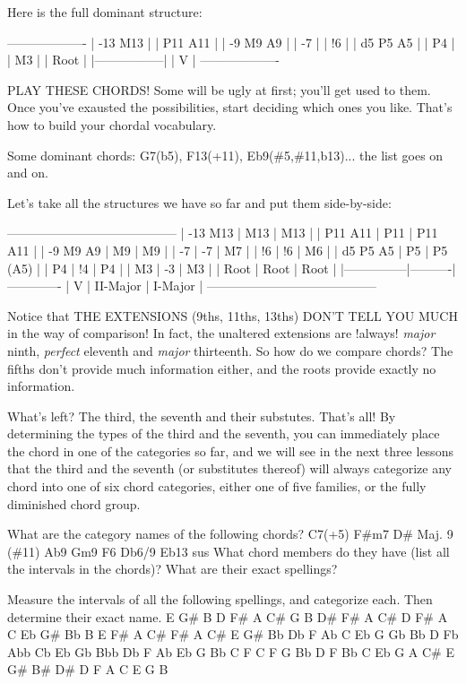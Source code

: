 Here is the full dominant structure:

-------------------
| -13  M13        |
|      P11  A11   |
| -9    M9   A9   |
|       -7        |
|       !6        |
|  d5   P5   A5   |
|       P4        |
|       M3        |
|      Root       |
|-----------------|
|        V        |
-------------------

PLAY THESE CHORDS! Some will be ugly at first; you'll get used to them. Once
you've exausted the possibilities, start deciding which ones you like. That's
how to build your chordal vocabulary.

Some dominant chords: G7(b5), F13(+11), Eb9(\#5,\#11,b13)... the list goes on and
on.

Let's take all the structures we have so far and put them side-by-side:

-----------------------------------------
| -13  M13      |   M13    |  M13       |
|      P11  A11 |   P11    |  P11  A11  |
|  -9   M9   A9 |    M9    |   M9       |
|       -7      |    -7    |   M7       |
|       !6      |    !6    |   M6       |
|  d5   P5   A5 |    P5    |   P5 (A5)  |
|       P4      |    !4    |   P4       |
|       M3      |    -3    |   M3       |
|      Root     |   Root   |  Root      |
|---------------|----------|-------------
|        V      | II-Major | I-Major    |
-----------------------------------------

Notice that THE EXTENSIONS (9ths, 11ths, 13ths) DON'T TELL YOU MUCH in the way
of comparison! In fact, the unaltered extensions are !always! \emph{major} ninth,
\emph{perfect} eleventh and \emph{major} thirteenth. So how do we compare chords? The
fifths don't provide much information either, and the roots provide exactly no
information. 

What's left? The third, the seventh and their substutes. That's all! By
determining the types of the third and the seventh, you can immediately
place the chord in one of the categories so far, and we will see in the
next three lessons that the third and the seventh (or substitutes
thereof) will always categorize any chord into one of six chord
categories, either one of five families, or the fully diminished chord
group.  

What are the category names of the following chords?
C7(+5) F\#m7 D\# Maj. 9 (\#11) Ab9 Gm9 F6 Db6/9 Eb13 sus
What chord members do they have (list all the intervals in the chords)?
What are their exact spellings?

Measure the intervals of all the following spellings, and categorize each.
Then determine their exact name.
E G\# B D F\# A C\#
G B D\# F\# A C\#
D F\# A C Eb G\# Bb
B E F\# A C\#
F\# A C\# E G\#
Bb Db F Ab C Eb G
Gb Bb D Fb Abb
Cb Eb Gb Bbb Db F Ab
Eb G Bb C F
C F G Bb D
F Bb C Eb G
A C\# E G\# B\# D\#
D F A C E G B

